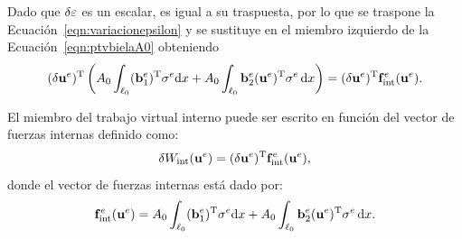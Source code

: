
%


Dado que $\delta \varepsilon$ es un escalar, es igual a su traspuesta, por lo que se traspone la Ecuación~\eqref{eqn:variacionepsilon} y se sustituye en el miembro izquierdo de la Ecuación~\eqref{eqn:ptvbielaA0} obteniendo %
%
\begin{equation}
(\delta  {\bf u}^e)^{\text{T}} \left( A_0 \int_{\ell_0}  ({\bf b}_1^e)^{\text{T}} \sigma^e {\text{d}} x + A_0 \int_{\ell_0}  {\bf b}_{2}^e({\bf u}^e)^{\text{T}} \sigma^e  \, {\text{d}} x \right) =
(\delta  {\bf u}^e)^{\text{T}} {\bf f}_{\text{int}}^e({\bf u}^e).
\end{equation}

El miembro del trabajo virtual interno puede ser escrito en función del vector de fuerzas internas definido como:
%
\begin{equation}
\delta  W_{\text{int}}({\bf u}^e) = (\delta  {\bf u}^e)^{\text{T}} {\bf f}_{\text{int}}^e({\bf u}^e),
\end{equation}
%
donde el vector de fuerzas internas está dado por:
%
\begin{equation}
{\bf f}_{\text{int}}^e({\bf u}^e) = A_0 \int_{\ell_0}  ({\bf b}_1^e)^{\text{T}} \sigma^e {\text{d}} x + A_0 \int_{\ell_0}  {\bf b}_{2}^e({\bf u}^e)^{\text{T}} \sigma^e  \, {\text{d}} x .
\end{equation}

